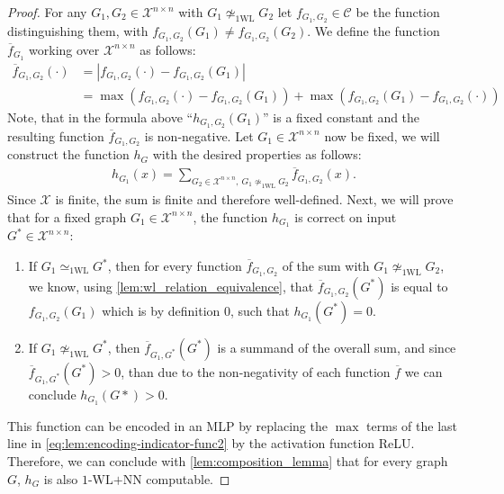\documentclass[11pt, dvipsnames, DIV=12]{scrreprt}
\theoremstyle{definition}
\newcommand{\cC}{\mathcal{C}}
\newcommand{\cX}{\mathcal{X}}
\newcommand{\wlnn}{\text{1-WL+NN}}
\newcommand{\wliso}{\simeq_{\text{1WL}}}
\newcommand{\xnn}{\mathcal{X}^{n \times n}}
\begin{document}
\begin{proof}
    For any $G_1, G_2 \in \xnn$ with $G_1 \not\wliso G_2$ let $f_{G_1, G_2} \in \cC$ be the function distinguishing them, with $f_{G_1, G_2}(G_1) \neq f_{G_1, G_2}(G_2)$. We define the function $\overline{f}_{G_1}$ working over $\xnn$ as follows:
    \begin{align}\label{eq:lem:encoding-indicator-func2}
        \overline{f}_{G_1, G_2}(\cdot) &= |f_{G_1, G_2}(\cdot) - f_{G_1, G_2}(G_1)| \nonumber \nonumber\\
        &= \max(f_{G_1, G_2}(\cdot) - f_{G_1, G_2}(G_1)) + \max(f_{G_1, G_2}(G_1) - f_{G_1, G_2}(\cdot))
    \end{align}
    Note, that in the formula above ``$h_{G_1, G_2}(G_1)$'' is a fixed constant and the resulting function $\overline{f}_{G_1, G_2}$ is non-negative.
    Let $G_1 \in \xnn$ now be fixed, we will construct the function $h_G$ with the desired properties as follows:
    \begin{align*}
        h_{G_1}(x) = \sum_{G_2 \in \xnn, \ G_1 \not\wliso G_2} \overline{f}_{G_1, G_2}(x).
    \end{align*}
    Since $\cX$ is finite, the sum is finite and therefore well-defined. Next, we will prove that for a fixed graph $G_1 \in \xnn$, the function $h_{G_1}$ is correct on input $G^* \in \xnn$:
    \begin{enumerate}
        \item If $G_1 \wliso G^*$, then for every function $\overline{f}_{G_1, G_2}$ of the sum with $G_1 \not\wliso G_2$, we know, using \cref{lem:wl_relation_equivalence}, that $\overline{f}_{G_1, G_2}(G^*)$ is equal to $f_{G_1, G_2}(G_1)$ which is by definition $0$, such that $h_{G_1}(G^*) = 0$.
        \item If $G_1 \not\wliso G^*$, then $\overline{f}_{G_1, G^*}(G^*)$ is a summand of the overall sum, and since $\overline{f}_{G_1, G^*}(G^*) > 0$, than due to the non-negativity of each function $\overline{f}$ we can conclude $h_{G_1}(G*) > 0$.
    \end{enumerate}

    This function can be encoded in an MLP by replacing the $\max$ terms of the last line in \autoref{eq:lem:encoding-indicator-func2} by the activation function ReLU. Therefore, we can conclude with \cref{lem:composition_lemma} that for every graph $G$, $h_G$ is also $\wlnn$ computable.
\end{proof}
\end{document}

